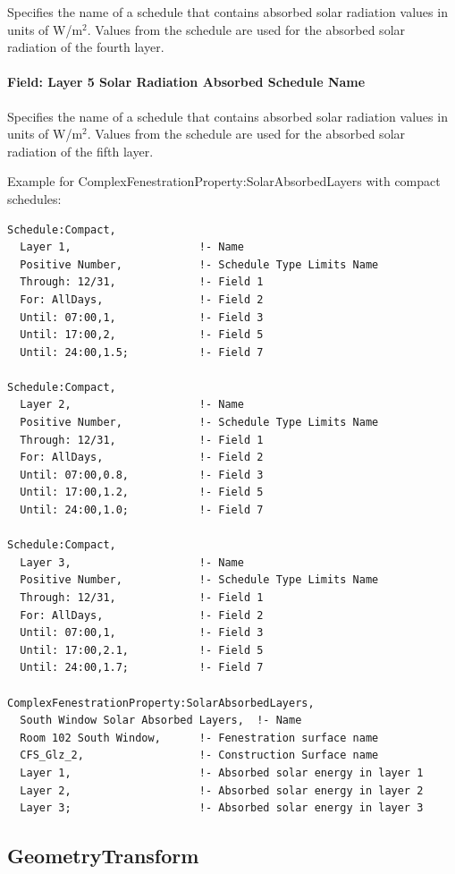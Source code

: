 Specifies the name of a schedule that contains absorbed solar radiation values in units of W/m\(^{2}\). Values from the schedule are used for the absorbed solar radiation of the fourth layer.

\paragraph{Field: Layer 5 Solar Radiation Absorbed Schedule Name}\label{field-layer-5-solar-radiation-absorbed-schedule-name}

Specifies the name of a schedule that contains absorbed solar radiation values in units of W/m\(^{2}\). Values from the schedule are used for the absorbed solar radiation of the fifth layer.

Example for ComplexFenestrationProperty:SolarAbsorbedLayers with compact schedules:

\begin{lstlisting}
Schedule:Compact,
  Layer 1,                    !- Name
  Positive Number,            !- Schedule Type Limits Name
  Through: 12/31,             !- Field 1
  For: AllDays,               !- Field 2
  Until: 07:00,1,             !- Field 3
  Until: 17:00,2,             !- Field 5
  Until: 24:00,1.5;           !- Field 7

Schedule:Compact,
  Layer 2,                    !- Name
  Positive Number,            !- Schedule Type Limits Name
  Through: 12/31,             !- Field 1
  For: AllDays,               !- Field 2
  Until: 07:00,0.8,           !- Field 3
  Until: 17:00,1.2,           !- Field 5
  Until: 24:00,1.0;           !- Field 7

Schedule:Compact,
  Layer 3,                    !- Name
  Positive Number,            !- Schedule Type Limits Name
  Through: 12/31,             !- Field 1
  For: AllDays,               !- Field 2
  Until: 07:00,1,             !- Field 3
  Until: 17:00,2.1,           !- Field 5
  Until: 24:00,1.7;           !- Field 7

ComplexFenestrationProperty:SolarAbsorbedLayers,
  South Window Solar Absorbed Layers,  !- Name
  Room 102 South Window,      !- Fenestration surface name
  CFS_Glz_2,                  !- Construction Surface name
  Layer 1,                    !- Absorbed solar energy in layer 1
  Layer 2,                    !- Absorbed solar energy in layer 2
  Layer 3;                    !- Absorbed solar energy in layer 3
\end{lstlisting}

\subsection{GeometryTransform}\label{geometrytransform}

